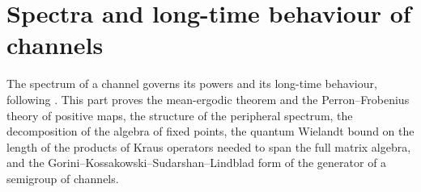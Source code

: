\part{Spectra and long-time behaviour of channels}
\label{part:spectra}

The spectrum of a channel governs its powers and its long-time behaviour,
following \cite[Chapters~6 and~7]{Wolf2012Quantum}. This part proves the
mean-ergodic theorem and the Perron--Frobenius theory of positive maps, the
structure of the peripheral spectrum, the decomposition of the algebra of fixed
points, the quantum Wielandt bound on the length of the products of Kraus
operators needed to span the full matrix algebra, and the
Gorini--Kossakowski--Sudarshan--Lindblad form of the generator of a semigroup
of channels.
